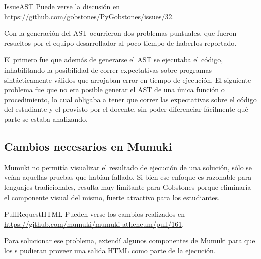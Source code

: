 \sepfootnotecontent
  {IssueAST}
  {Puede verse la discusión en \url{https://github.com/gobstones/PyGobstones/issues/32}.}

Con la generación del AST ocurrieron dos problemas puntuales, que fueron resueltos por el equipo desarrollador al poco tiempo de haberlos reportado.

El primero fue que además de generarse el AST se ejecutaba el código, inhabilitando la posibilidad de correr expectativas sobre programas sintácticamente válidos que arrojaban error en tiempo de ejecución. El siguiente problema fue que no era posible generar el AST de una única función o procedimiento, lo cual obligaba a tener que correr las expectativas sobre el código del estudiante y el provisto por el docente, sin poder diferenciar fácilmente qué parte se estaba analizando.

\subsection{Cambios necesarios en Mumuki}
Mumuki no permitía visualizar el resultado de ejecución de una solución, sólo se veían aquellas pruebas que habían fallado. Si bien ese enfoque es razonable para lenguajes tradicionales, resulta muy limitante para Gobstones porque eliminaría el componente visual del mismo, fuerte atractivo para los estudiantes.

\sepfootnotecontent
  {PullRequestHTML}
  {Pueden verse los cambios realizados en \url{https://github.com/mumuki/mumuki-atheneum/pull/161}.}

Para solucionar ese problema, extendí algunos componentes de Mumuki para que los \runner s pudieran proveer una salida HTML como parte de la ejecución.
